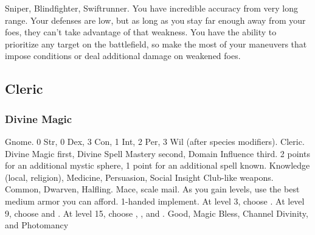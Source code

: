              Sniper, Blindfighter, Swiftrunner.
             You have incredible accuracy from very long range.
            Your defenses are low, but as long as you stay far enough away from your foes, they can't take advantage of that weakness.
            You have the ability to prioritize any target on the battlefield, so make the most of your maneuvers that impose conditions or deal additional damage on weakened foes.

    \subsection{Cleric}

        \subsubsection{Divine Magic}
             Gnome.
             0 Str, 0 Dex, 3 Con, 1 Int, 2 Per, 3 Wil (after species modifiers).
             Cleric.
             Divine Magic first, Divine Spell Mastery second, Domain Influence third.
             2 points for an additional mystic sphere, 1 point for an additional spell known.
             Knowledge (local, religion), Medicine, Persuasion, Social Insight
             Club-like weapons.
             Common, Dwarven, Halfling.
             Mace, scale mail. As you gain levels, use the best medium armor you can afford.
             1-handed implement.
                At level 3, choose .
                At level 9, choose  and .
                At level 15, choose , , and .
             Good, Magic
             Bless, Channel Divinity, and Photomancy
